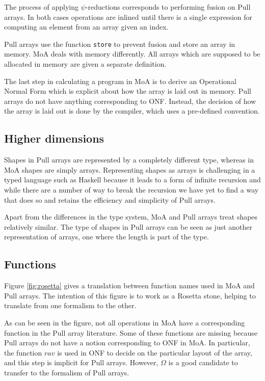 \documentclass[preprint]{sigplanconf}
\begin{document}
The process of applying \(\psi\)-reductions corresponds to performing
fusion on Pull arrays. In both cases operations are inlined until
there is a single expression for computing an element from an array
given an index.

Pull arrays use the function \verb!store! to prevent fusion and store
an array in memory. MoA deals with memory differently. All arrays
which are supposed to be allocated in memory are given a separate
definition.

The last step in calculating a program in MoA is to derive an
Operational Normal Form which is explicit about how the array is laid
out in memory. Pull arrays do not have anything corresponding to
ONF. Instead, the decision of how the array is laid out is done by the
compiler, which uses a pre-defined convention.

\subsection{Higher dimensions}
\label{sec:highdim}

Shapes in Pull arrays are represented by a completely different type,
whereas in MoA shapes are simply arrays. Representing shapes as arrays
is challenging in a typed language such as Haskell because it leads to
a form of infinite recursion and while there are a number of way to
break the recursion we have yet to find a way that does so and retains
the efficiency and simplicity of Pull arrays.

Apart from the differences in the type system, MoA and Pull arrays
treat shapes relatively similar. The type of shapes in Pull arrays can
be seen as just another representation of arrays, one where the length
is part of the type.

\subsection{Functions}
\label{sec:notation}

Figure \ref{fig:rosetta} gives a translation between function names
used in MoA and Pull arrays. The intention of this figure is to work
as a Rosetta stone, helping to translate from one formalism to the
other.

As can be seen in the figure, not all operations in MoA have a
corresponding function in the Pull array literature. Some of these
functions are missing because Pull arrays do not have a notion
corresponding to ONF in MoA. In particular, the function $rav$ is used
in ONF to decide on the particular layout of the array, and this step
is implicit for Pull arrays. However, $\Omega$ is a good candidate to
transfer to the formalism of Pull arrays.
\end{document}
